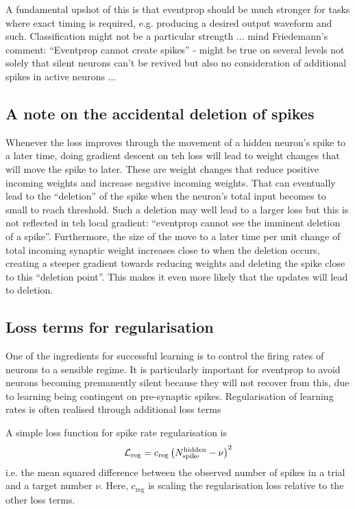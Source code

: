 \documentclass[a4paper]{article}
\begin{document}
A fundamental upshot of this is that eventprop should be much stronger for tasks where exact timing is required, e.g. producing a desired output waveform and such. Classification might not be a particular strength ... mind Friedemann's comment: ``Eventprop cannot create spikes'' - might be true on several levels not solely that silent neurons can't be revived but also no consideration of additional spikes in active neurons ...

\subsection{A note on the accidental deletion of spikes}
Whenever the loss improves through the movement of a hidden neuron's
spike to a later time, doing gradient descent on teh loss will lead to weight
changes that will move the spike to later. These are weight changes
that reduce positive incoming weights and increase negative incoming
weights. That can eventually lead to the ``deletion'' of the spike
when the neuron's total input becomes to small to reach
threshold. Such a deletion may well lead to a larger loss but this is
not reflected in teh local gradient: ``eventprop cannot see the
imminent deletion of a spike''. Furthermore, the size of the move to a later time
per unit change of total incoming synaptic weight increases close to
when the deletion occurs, creating a steeper gradient towards reducing
weights and deleting the spike close to this ``deletion point''. This
makes it even more likely that the updates will lead to deletion.

  \subsection{Loss terms for regularisation}
  One of the ingredients for successful learning is to control the firing rates of neurons to a sensible regime. It is particularly important for eventprop to avoid neurons becoming premanently silent because they will not recover from this, due to learning being contingent on pre-synaptic spikes. Regularisation of learning rates is often realised through additional loss terms

  A simple loss function for spike rate regularisation is
  \begin{align}
    {\cal L}_{\text{reg}} = c_{\text{reg}}\left(N_{\text{spike}}^{\text{hidden}} - \nu\right)^2
  \end{align}
  i.e. the mean squared difference between the observed number of spikes in a trial and a target number $\nu$. Here, $c_{\text{reg}}$ is scaling the regularisation loss relative to the other loss terms.
\end{document}

